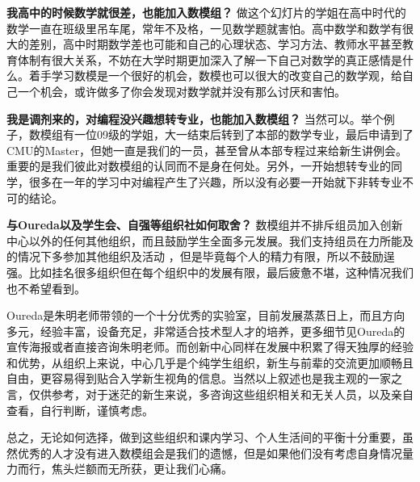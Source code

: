 \documentclass[xcolor={usenames,dvipsnames}]{beamer}
\begin{document}
\begin{frame}
\begin{block}{\textbf{我高中的时候数学就很差，也能加入数模组？}}
做这个幻灯片的学姐在高中时代的数学一直在班级里吊车尾，常年不及格，一见数学题就害怕。高中数学和数学有很大的差别，高中时期数学差也可能和自己的心理状态、学习方法、教师水平甚至教育体制有很大关系，不妨在大学时期更加深入了解一下自己对数学的真正感情是什么。着手学习数模是一个很好的机会，数模也可以很大的改变自己的数学观，给自己一个机会，或许做多了你会发现对数学就并没有那么讨厌和害怕。
\end{block}
\begin{alertblock}{\textbf{我是调剂来的，对编程没兴趣想转专业，也能加入数模组？}}
当然可以。举个例子，数模组有一位09级的学姐，大一结束后转到了本部的数学专业，最后申请到了CMU的Master，但她一直是我们的一员，甚至曾从本部专程过来给新生讲例会。重要的是我们彼此对数模组的认同而不是身在何处。另外，一开始想转专业的同学，很多在一年的学习中对编程产生了兴趣，所以没有必要一开始就下非转专业不可的结论。
\end{alertblock}
\end{frame}

\begin{frame}
    \begin{exampleblock}{\textbf{与Oureda以及学生会、自强等组织社如何取舍？}}
    数模组并不排斥组员加入创新中心以外的任何其他组织，而且鼓励学生全面多元发展。我们支持组员在力所能及的情况下多参加其他组织及活动 ，但是毕竟每个人的精力有限，所以不鼓励逞强。比如挂名很多组织但在每个组织中的发展有限，最后疲惫不堪，这种情况我们也不希望看到。
    
    Oureda是朱明老师带领的一个十分优秀的实验室，目前发展蒸蒸日上，而且方向多元，经验丰富，设备充足，非常适合技术型人才的培养，更多细节见Oureda的宣传海报或者直接咨询朱明老师。而创新中心同样在发展中积累了得天独厚的经验和优势，从组织上来说，中心几乎是个纯学生组织，新生与前辈的交流更加顺畅且自由，更容易得到贴合入学新生视角的信息。当然以上叙述也是我主观的一家之言，仅供参考，对于迷茫的新生来说，多咨询这些组织相关和无关人员，以及亲自查看，自行判断，谨慎考虑。
    
    总之，无论如何选择，做到这些组织和课内学习、个人生活间的平衡十分重要，虽然优秀的人才没有进入数模组会是我们的遗憾，但是如果他们没有考虑自身情况量力而行，焦头烂额而无所获，更让我们心痛。
    \end{exampleblock}
\end{frame}
\end{document}

